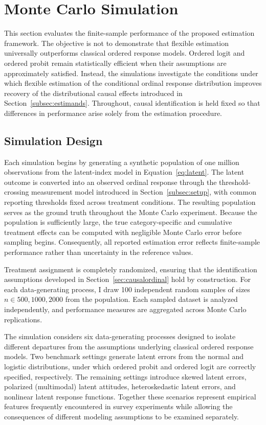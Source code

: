 \documentclass{article}
\begin{document}
\clearpage

\section{Monte Carlo Simulation}
\label{sec:simulation}

This section evaluates the finite-sample performance of the proposed estimation framework. The objective is not to demonstrate that flexible estimation universally outperforms classical ordered response models. Ordered logit and ordered probit remain statistically efficient when their assumptions are approximately satisfied. Instead, the simulations investigate the conditions under which flexible estimation of the conditional ordinal response distribution improves recovery of the distributional causal effects introduced in Section~\ref{subsec:estimands}. Throughout, causal identification is held fixed so that differences in performance arise solely from the estimation procedure.

\subsection{Simulation Design}
\label{subsec:sim_design}

Each simulation begins by generating a synthetic population of one million observations from the latent-index model in Equation~\eqref{eq:latent}. The latent outcome is converted into an observed ordinal response through the threshold-crossing measurement model introduced in Section~\ref{subsec:setup}, with common reporting thresholds fixed across treatment conditions. The resulting population serves as the ground truth throughout the Monte Carlo experiment. Because the population is sufficiently large, the true category-specific and cumulative treatment effects can be computed with negligible Monte Carlo error before sampling begins. Consequently, all reported estimation error reflects finite-sample performance rather than uncertainty in the reference values.

Treatment assignment is completely randomized, ensuring that the identification assumptions developed in Section~\ref{sec:causalordinal} hold by construction. For each data-generating process, I draw 100 independent random samples of sizes $n\in{500,1000,2000}$ from the population. Each sampled dataset is analyzed independently, and performance measures are aggregated across Monte Carlo replications.

The simulation considers six data-generating processes designed to isolate different departures from the assumptions underlying classical ordered response models. Two benchmark settings generate latent errors from the normal and logistic distributions, under which ordered probit and ordered logit are correctly specified, respectively. The remaining settings introduce skewed latent errors, polarized (multimodal) latent attitudes, heteroskedastic latent errors, and nonlinear latent response functions. Together these scenarios represent empirical features frequently encountered in survey experiments while allowing the consequences of different modeling assumptions to be examined separately.
\end{document}
